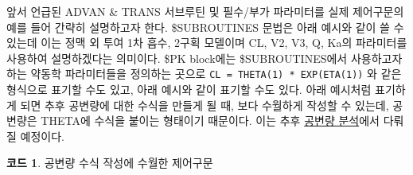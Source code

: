 \documentclass[
  11pt,
  krantz2,
  a4paper]{krantz}
\newenvironment{Shaded}{\begin{snugshade}}{\end{snugshade}}
\newcommand{\DecValTok}[1]{\textcolor[rgb]{0.00,0.00,0.81}{#1}}
\newcommand{\KeywordTok}[1]{\textcolor[rgb]{0.13,0.29,0.53}{\textbf{#1}}}
\newcommand{\NormalTok}[1]{#1}
\newcommand{\OperatorTok}[1]{\textcolor[rgb]{0.81,0.36,0.00}{\textbf{#1}}}
\newcommand{\StringTok}[1]{\textcolor[rgb]{0.31,0.60,0.02}{#1}}
\theoremstyle{definition}
\theoremstyle{definition}
\newtheorem{example}{코드}[chapter]
\theoremstyle{definition}
\theoremstyle{remark}
\begin{document}
앞서 언급된 ADVAN \& TRANS 서브루틴 및 필수/부가 파라미터를 실제 제어구문의 예를 들어 간략히 설명하고자 한다. \$SUBROUTINES 문법은 아래 예시와 같이 쓸 수 있는데 이는 정맥 외 투여 1차 흡수, 2구획 모델이며 CL, V2, V3, Q, Ka의 파라미터를 사용하여 설명하겠다는 의미이다. \$PK block에는 \$SUBROUTINES에서 사용하고자 하는 약동학 파라미터들을 정의하는 곳으로 \texttt{CL\ =\ THETA(1)\ *\ EXP(ETA(1))} 와 같은 형식으로 표기할 수도 있고, 아래 예시와 같이 표기할 수도 있다. 아래 예시처럼 표기하게 되면 추후 공변량에 대한 수식을 만들게 될 때, 보다 수월하게 작성할 수 있는데, 공변량은 THETA에 수식을 붙이는 형태이기 때문이다. 이는 추후 \protect\hyperlink{covariate-analysis}{공변량 분석}에서 다뤄질 예정이다.

\begin{example}
\protect\hypertarget{exm:code-example-advan4}{}{\label{exm:code-example-advan4} }공변량 수식 작성에 수월한 제어구문
\end{example}

\begin{Shaded}
\end{Shaded}
\end{document}
